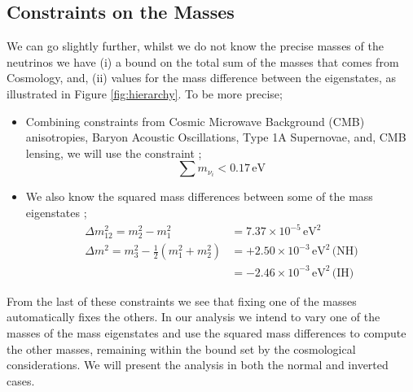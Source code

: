 \documentclass[10pt]{article}
\begin{document}
\subsection{Constraints on the Masses}
We can go slightly further, whilst we do not know the precise masses of the neutrinos we have (i) a bound on the total sum of the masses that comes from Cosmology, and, (ii) values for the mass difference between the eigenstates, as illustrated in Figure \ref{fig:hierarchy}. To be more precise;
\begin{itemize}
  \item Combining constraints from Cosmic Microwave Background (CMB) anisotropies, Baryon Acoustic Oscillations, Type 1A Supernovae, and, CMB lensing, we will use the constraint \cite{Couchot2017};
  \begin{equation}
    \sum{m_{\nu_i}} < 0.17 \, \textrm{eV}
  \end{equation}
  \item We also know the squared mass differences between some of the mass eigenstates \cite{Couchot2017};
  \begin{align}
    \Delta m_{12}^2 = m_2^2 - m_1^2 &= 7.37 \times 10^{-5}\,\textrm{eV}^2 \\
    \Delta m^2 = m_3^2 - \frac{1}{2}(m_1^2 + m_2^2) &= +2.50 \times 10^{-3} \, \textrm{eV}^2\, \textrm{(NH)} \\
    &= -2.46 \times 10^{-3} \, \textrm{eV}^2\, \textrm{(IH)}
  \end{align}
\end{itemize}
From the last of these constraints we see that fixing one of the masses automatically fixes the others. In our analysis we intend to vary one of the masses of the mass eigenstates and use the squared mass differences to compute the other masses, remaining within the bound set by the cosmological considerations. We will present the analysis in both the normal and inverted cases.
\end{document}
